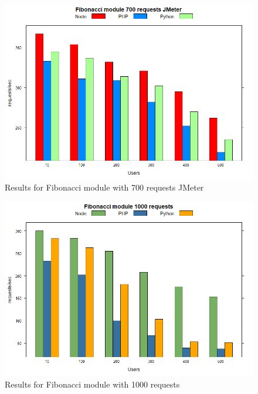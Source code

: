 \documentclass[../thesis.tex]{subfiles}
\begin{document}
\begin{figure}[H]
	\centering
	\includegraphics[width=1\textwidth]{../images/700requestsFiboJMeter.png}
	\caption{Results for Fibonacci module with 700 requests JMeter}
	\label{rys1}
\end{figure}
\begin{figure}[H]
	\centering
	\includegraphics[width=1\textwidth]{../images/1000requestsFibo.png}
	\caption{Results for Fibonacci module with 1000 requests}
	\label{rys1}
\end{figure}
\end{document}
